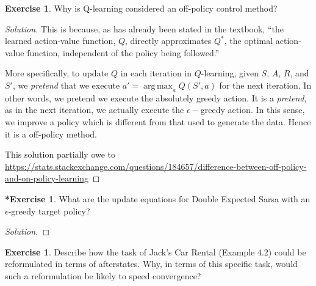 \documentclass[oneside,11pt]{article}
\theoremstyle{definition}
\newtheorem{exer}[thm]{Exercise}
\newtheorem{exerstar}[thm]{*Exercise}
\DeclareMathOperator*{\argmax}{arg\,max}
\newenvironment{solution}
{\renewcommand\qedsymbol{$\blacksquare$}\begin{proof}[Solution]} {\end{proof}}
\begin{document}
\begin{exer}
Why is Q-learning considered an off-policy control method?
\end{exer}

\begin{shaded}
\begin{solution} 
This is because, as has already been stated in the textbook, ``the learned action-value function, $Q$, directly approximates $Q^{\ast}$, the optimal action-value function, independent of the policy being followed.'' 

More specifically, to update $Q$ in each iteration in $Q$-learning, given $S$, $A$, $R$, and $S'$, we \emph{pretend} that we execute $a' = \argmax_a Q(S', a)$ for the next iteration. In other words, we pretend we execute the absolutely greedy action. It is a \emph{pretend}, as in the next iteration, we actually execute the $\epsilon-$greedy action. In this sense, we improve a policy which is different from that used to generate the data. Hence it is a off-policy method.

This solution partially owe to \url{https://stats.stackexchange.com/questions/184657/difference-between-off-policy-and-on-policy-learning}

\end{solution} 
\end{shaded}


\begin{exerstar}
What are the update equations for Double Expected Sarsa with an $\epsilon$-greedy target policy?
\end{exerstar}

\begin{shaded}
\begin{solution} 


\end{solution} 
\end{shaded}


\begin{exer}
Describe how the task of Jack's Car Rental (Example 4.2) could be reformulated in terms of afterstates. Why, in terms of this specific task, would such a reformulation be likely to speed convergence?
\end{exer}
\end{document}
